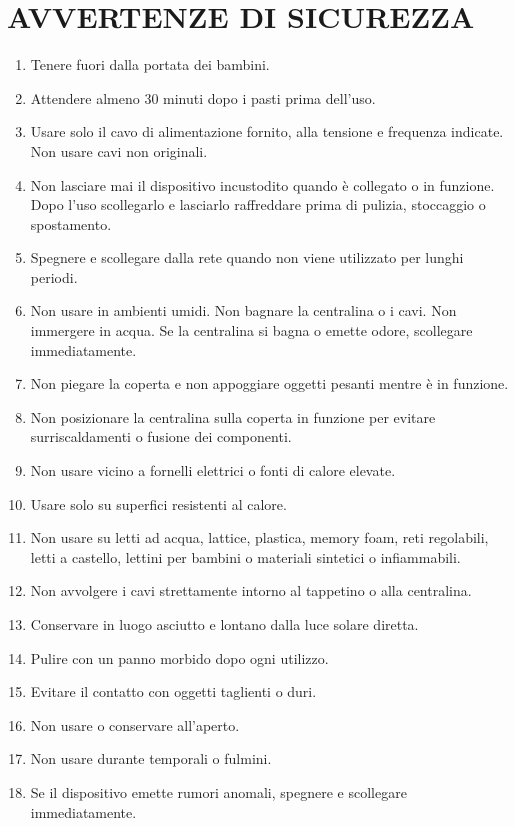 \documentclass[10pt]{article}
\begin{document}
\section{AVVERTENZE DI SICUREZZA}
\begin{enumerate}
  \item Tenere fuori dalla portata dei bambini.
  \item Attendere almeno 30 minuti dopo i pasti prima dell'uso.
  \item Usare solo il cavo di alimentazione fornito, alla tensione e frequenza indicate. Non usare cavi non originali.
  \item Non lasciare mai il dispositivo incustodito quando è collegato o in funzione. Dopo l'uso scollegarlo e lasciarlo raffreddare prima di pulizia, stoccaggio o spostamento.
  \item Spegnere e scollegare dalla rete quando non viene utilizzato per lunghi periodi.
  \item Non usare in ambienti umidi. Non bagnare la centralina o i cavi. Non immergere in acqua. Se la centralina si bagna o emette odore, scollegare immediatamente.
  \item Non piegare la coperta e non appoggiare oggetti pesanti mentre è in funzione.
  \item Non posizionare la centralina sulla coperta in funzione per evitare surriscaldamenti o fusione dei componenti.
  \item Non usare vicino a fornelli elettrici o fonti di calore elevate.
  \item Usare solo su superfici resistenti al calore.
  \item Non usare su letti ad acqua, lattice, plastica, memory foam, reti regolabili, letti a castello, lettini per bambini o materiali sintetici o infiammabili.
  \item Non avvolgere i cavi strettamente intorno al tappetino o alla centralina.
  \item Conservare in luogo asciutto e lontano dalla luce solare diretta.
  \item Pulire con un panno morbido dopo ogni utilizzo.
  \item Evitare il contatto con oggetti taglienti o duri.
  \item Non usare o conservare all'aperto.
  \item Non usare durante temporali o fulmini.
  \item Se il dispositivo emette rumori anomali, spegnere e scollegare immediatamente.
\end{enumerate}
\end{document}
